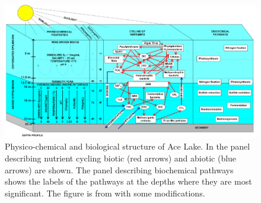 \begin{figure}
\centering
\includegraphics[width=\textwidth]{ace_figures/ace_diagram.pdf}
\caption[Physico-chemical and biological structure of Ace Lake from \cite{Lauro2011}]{Physico-chemical and biological structure of Ace Lake.
In the panel describing nutrient cycling biotic (red arrows) and abiotic (blue arrows) are shown.
The panel describing biochemical pathways shows the labels of the pathways at the depths where they are most significant.
The figure is from \citet{Lauro2011} with some modifications.
}
\label{fig:ace_diagram}

\end{figure}
